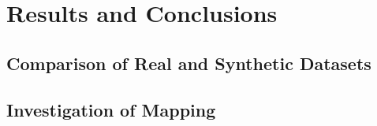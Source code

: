 \chapter{Results and Conclusions}

\section{Comparison of Real and Synthetic Datasets}
\section{Investigation of Mapping}